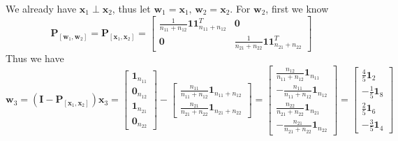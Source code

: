 \documentclass{article}
\begin{document}
\begin{enumerate}[leftmargin = 0 em, label = \arabic*., font = \bfseries]
\begin{enumerate}
	We already have $\bm x_1 \perp \bm x_2$, thus let $\bm w_1 = \bm x_1,\, \bm w_2 = \bm x_2$. For $\bm w_2$, first we know
	\[\bm P_{[\bm w_1 , \bm w_2]} = \bm P_{[\bm x_1, \bm x_2]} = \begin{bmatrix}
		\frac{1}{n_{11} + n_{12}} \bm 1 \bm 1^T_{n_{11} + n_{12}}& \bm 0\\
		\bm 0 & \frac{1}{n_{21} + n_{22}} \bm 1 \bm 1^T_{n_{21} + n_{22}}
	\end{bmatrix}\]
	Thus we have
	\[\bm w_3 = (\bm I - \bm P_{[\bm x_1 , \bm x_2]}) \bm x_3 = \begin{bmatrix}
		\bm 1_{n_{11}}\\ \bm 0_{n_{12}} \\ \bm 1_{n_{21}} \\ \bm 0_{n_{22}}
	\end{bmatrix} - \begin{bmatrix}
		\frac{n_{11}}{n_{11} + n_{12}} \bm 1_{n_{11} + n_{12}}\\
		\frac{n_{21}}{n_{21} + n_{22}} \bm 1_{n_{21} + n_{22}}
	\end{bmatrix} = \begin{bmatrix}
		\frac{n_{12}}{n_{11} + n_{12}} \bm 1_{n_{11}}\\
		-\frac{n_{11}}{n_{11} + n_{12}} \bm 1_{n_{12}}\\
		\frac{n_{22}}{n_{21} + n_{22}} \bm 1_{n_{21}}\\
		-\frac{n_{21}}{n_{21} + n_{22}} \bm 1_{n_{22}}
	\end{bmatrix} = \begin{bmatrix}
		\frac{4}{5} \bm 1_{2}\\
		-\frac{1}{5} \bm 1_{8}\\
		\frac{2}{5} \bm 1_{6}\\
		-\frac{3}{5} \bm 1_{4}
	\end{bmatrix}\] 


\end{enumerate}
\end{enumerate}
\end{document}
